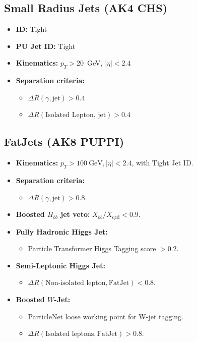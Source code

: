 \subsection*{Small Radius Jets (AK4 CHS)}
\begin{itemize}
    \item \textbf{ID:} Tight
    \item \textbf{PU Jet ID:} Tight
    \item \textbf{Kinematics:} \(p_T > 20\)~GeV, \(|\eta| < 2.4\)
    \item \textbf{Separation criteria:}
        \begin{itemize}
            \item \(\Delta R(\gamma, \text{jet}) > 0.4\)
            \item \(\Delta R(\text{Isolated Lepton, jet}) > 0.4\)
        \end{itemize}
\end{itemize}

\subsection*{FatJets (AK8 PUPPI)}
\begin{itemize}
    \item \textbf{Kinematics:} \(p_T > 100~\text{GeV}, |\eta| < 2.4\), with Tight Jet ID.
    \item \textbf{Separation criteria:}
    \begin{itemize}
        \item \(\Delta R(\gamma, \text{jet}) > 0.8\).
    \end{itemize}
    \item \textbf{Boosted \(H_{bb}\) jet veto:} \(X_{bb}/X_{\text{qcd}} < 0.9\).
    \item \textbf{Fully Hadronic Higgs Jet:}
    \begin{itemize}
        \item Particle Transformer Higgs Tagging score \(> 0.2\).
    \end{itemize}
    \item \textbf{Semi-Leptonic Higgs Jet:}
    \begin{itemize}
        \item \(\Delta R(\text{Non-isolated lepton}, \text{FatJet}) < 0.8\).
    \end{itemize}
    \item \textbf{Boosted \(W\)-Jet:}
    \begin{itemize}
        \item ParticleNet loose working point for W-jet tagging.
        \item \(\Delta R(\text{Isolated leptons}, \text{FatJet}) > 0.8\).
    \end{itemize}
\end{itemize}

